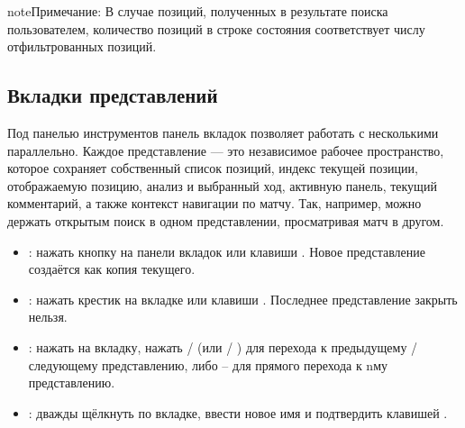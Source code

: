 \documentclass[letterpaper,10pt,russian]{sphinxmanual}
\begin{document}
\begin{sphinxadmonition}{note}{Примечание:}
\sphinxAtStartPar
В случае позиций, полученных в результате поиска пользователем, количество позиций в строке состояния соответствует числу отфильтрованных позиций.
\end{sphinxadmonition}


\subsection{Вкладки представлений}
\label{\detokenize{manuel:onglets-de-vues}}\label{\detokenize{manuel:onglets-vues}}
\sphinxAtStartPar
Под панелью инструментов панель вкладок позволяет работать с несколькими  параллельно. Каждое представление — это независимое рабочее пространство, которое сохраняет собственный список позиций, индекс текущей позиции, отображаемую позицию, анализ и выбранный ход, активную панель, текущий комментарий, а также контекст навигации по матчу. Так, например, можно держать открытым поиск в одном представлении, просматривая матч в другом.
\begin{itemize}
\item {} 
\sphinxAtStartPar
{}: нажать кнопку \sphinxstyleemphasis{+} на панели вкладок или клавиши . Новое представление создаётся как копия текущего.

\item {} 
\sphinxAtStartPar
{}: нажать крестик на вкладке или клавиши . Последнее представление закрыть нельзя.

\item {} 
\sphinxAtStartPar
{}: нажать на вкладку, нажать  /  (или  / ) для перехода к предыдущему / следующему представлению, либо – для прямого перехода к n\sphinxhyphen{}му представлению.

\item {} 
\sphinxAtStartPar
{}: дважды щёлкнуть по вкладке, ввести новое имя и подтвердить клавишей .

\end{itemize}
\end{document}
